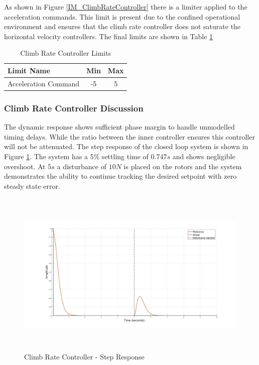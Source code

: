 	 As shown in Figure \ref{IM_ClimbRateController} there is a limiter applied to the acceleration commands. This limit is present due to the confined operational environment and ensures that the climb rate controller does not saturate the horizontal velocity controllers. The final limits are shown in Table \ref{tab:ClimbrateLimits}
	 
	 \begin{table}[!]
	 	\centering
	 	\begin{tabular}{l | c | c |}
	 		Limit Name 						& Min & Max\\
	 		\hline\hline
	 		Acceleration Command 		    & -5 & 5 \\
	 	\end{tabular}
	 	\caption{Climb Rate Controller Limits}
	 	\label{tab:ClimbrateLimits}
	 \end{table}
	 
	 \subsubsection{Climb Rate Controller Discussion}
	 The dynamic response shows sufficient phase margin to handle unmodelled timing delays. While the ratio between the inner controller ensures this controller will not be attenuated. The step response of the closed loop system is shown in Figure \ref{IM_ClimbRateStep}. The system has a $5$\% settling time of $0.747s$ and shows negligible overshoot. At $5s$ a disturbance of $10N$ is placed on the rotors and the system demonstrates the ability to continue tracking the desired setpoint with zero steady state error.
	 
	 \begin{figure}[H]
	 	\centering
	 	\includegraphics[height = 8cm]{../Design/Matlab/Controllers/climb_rate_step.jpg}
	 	\caption{Climb Rate Controller -  Step Response}
	 	\label{IM_ClimbRateStep}
	 \end{figure}
	 
